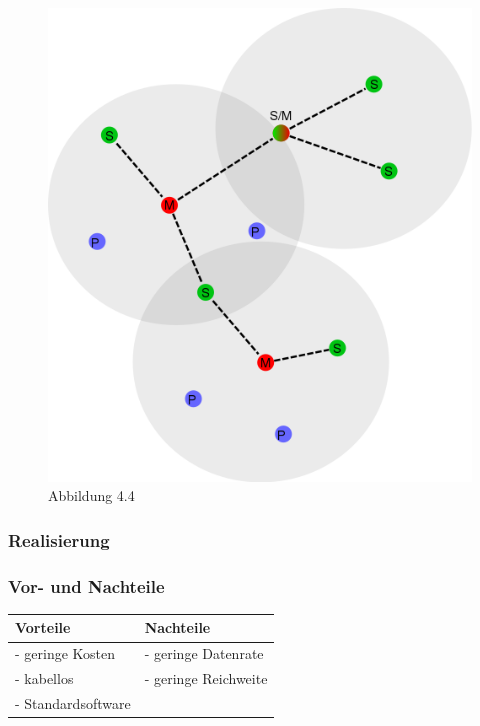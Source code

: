 \begin{figure}[h!]
	\includegraphics[width=\linewidth]{pico_scatternet.png}
	\caption{Abbildung 4.4}
\end{figure}

\subsubsection{Realisierung}
\subsubsection{Vor- und Nachteile}
\begin{tabular}{l|l}
	Vorteile & Nachteile\\
	\hline - geringe Kosten & - geringe Datenrate\\
	\hline - kabellos & - geringe Reichweite\\
	\hline - Standardsoftware & \\
\end{tabular}